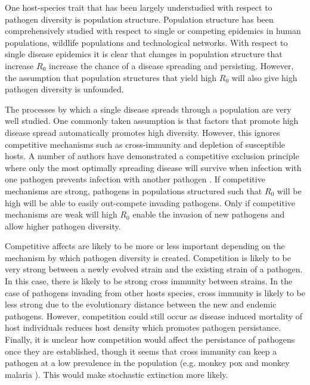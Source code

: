 One host-species trait that has been largely understudied with respect to pathogen diversity is population structure.
Population structure has been comprehensively studied with respect to single or competing epidemics in human populations, wildlife populations and technological networks.
With respect to single disease epidemics it is clear that changes in population structure that increase $R_0$ increase the chance of a disease spreading and persisting.
However, the assumption that population structures that yield high $R_0$ will also give high pathogen diversity \cite{nunn2003comparative} is unfounded.



The processes by which a single disease spreads through a population are very well studied.
One commonly taken assumption is that factors that promote high disease spread automatically promotes high diversity.
However, this ignores competitive mechanisms such as cross-immunity and depletion of susceptible hosts.
A number of authors have demonstrated a competitive exclusion principle where only the most optimally spreading disease will survive when infection with one pathogen prevents infection with another pathogen \cite{bremermann1989competitive, martcheva2013competitive, ackleh2003competitive, ackleh2014robust, turner2002impact}.
If competitive mechanisms are strong, pathogens in populations structured such that $R_0$ will be high will be able to easily out-compete invading pathogens.
Only if competitive mechanisms are weak will high $R_0$  enable the invasion of new pathogens and allow higher pathogen diversity.

Competitive affects are likely to be more or less important depending on the mechanism by which pathogen diversity is created.
Competition is likely to be very strong between a newly evolved strain and the existing strain of a pathogen. 
In this case, there is likely to be strong cross immunity between strains.
In the case of pathogens invading from other hosts species, cross immunity is likely to be less strong due to the evolutionary distance between the new and endemic pathogens.
However, competition could still occur as disease induced mortality of host individuals reduces host density which promotes pathogen persistance.
Finally, it is unclear how competition would affect the persistance of pathogens once they are established, though it seems that cross immunity can keep a pathogen at a low prevalence in the population (e.g. monkey pox \cite{rimoin2010major} and monkey malaria \cite{cox2008knowlesi}). 
This would make stochastic extinction more likely.

